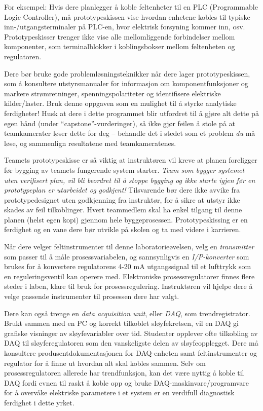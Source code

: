 For eksempel: Hvis dere planlegger å koble feltenheter til en PLC (Programmable Logic Controller), må prototypeskissen vise hvordan enhetene kobles til typiske inn-/utgangsterminaler på PLC-en, hvor elektrisk forsyning kommer inn, osv. Prototypeskisser trenger ikke vise alle mellomliggende forbindelser mellom komponenter, som terminalblokker i koblingsbokser mellom feltenheten og regulatoren.

Dere bør bruke gode problemløsningsteknikker når dere lager prototypeskissen, som å konsultere utstyrsmanualer for informasjon om komponentfunksjoner og markere strømretninger, spenningspolariteter og identifisere elektriske kilder/laster. Bruk denne oppgaven som en mulighet til å styrke analytiske ferdigheter! Husk at dere i dette programmet blir utfordret til å gjøre alt dette på egen hånd (under ``capstone''-vurderinger), så ikke gjør feilen å stole på at teamkamerater løser dette for deg -- behandle det i stedet som et problem {\it du} må løse, og sammenlign resultatene med teamkameratenes.

Teamets prototypeskisse er så viktig at instruktøren vil kreve at planen foreligger før bygging av teamets fungerende system starter. {\it Team som bygger systemet uten verifisert plan, vil bli beordret til å stoppe bygging og ikke starte igjen før en prototypeplan er utarbeidet og godkjent!} Tilsvarende bør dere ikke avvike fra prototypedesignet uten godkjenning fra instruktør, for å sikre at utstyr ikke skades av feil tilkoblinger. Hvert teammedlem skal ha enkel tilgang til denne planen (helst egen kopi) gjennom hele byggeprosessen. Prototypeskissing er en ferdighet og en vane dere bør utvikle på skolen og ta med videre i karrieren.

\vskip 10pt

Når dere velger feltinstrumenter til denne laboratorieøvelsen, velg en {\it transmitter} som passer til å måle prosessvariabelen, og sannsynligvis en {\it I/P-konverter} som brukes for å konvertere regulatorens 4-20 mA utgangssignal til et lufttrykk som en reguleringsventil kan operere med. Elektroniske prosessregulatorer finnes flere steder i laben, klare til bruk for prosessregulering. Instruktøren vil hjelpe dere å velge passende instrumenter til prosessen dere har valgt.

Dere kan også trenge en {\it data acquisition unit}, eller {\it DAQ}, som trendregistrator. Brukt sammen med en PC og korrekt tilkoblet sløyfekretsen, vil en DAQ gi grafiske visninger av sløyfevariabler over tid. Studenter opplever ofte tilkobling av DAQ til sløyferegulatoren som den vanskeligste delen av sløyfeopplegget. Dere må konsultere produsentdokumentasjonen for DAQ-enheten samt feltinstrumenter og regulator for å finne ut hvordan alt skal kobles sammen. Selv om prosessregulatoren allerede har trendfunksjon, kan det være nyttig å koble til DAQ fordi evnen til raskt å koble opp og bruke DAQ-maskinvare/programvare for å overvåke elektriske parametere i et system er en verdifull diagnostisk ferdighet i dette yrket.

